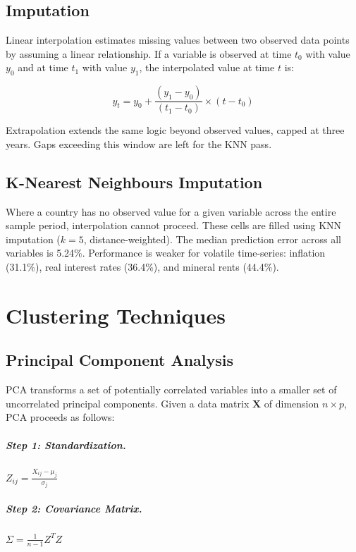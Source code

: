 \documentclass[12pt,a4paper]{report}
\begin{document}
\begin{appendices}
\section{Imputation}

Linear interpolation estimates missing values between two observed data points by assuming a linear relationship. If a variable is observed at time $t_0$ with value $y_0$ and at time $t_1$ with value $y_1$, the interpolated value at time $t$ is:

\begin{equation}
y_t = y_0 + \frac{(y_1 - y_0)}{(t_1 - t_0)} \times (t - t_0)
\end{equation}

Extrapolation extends the same logic beyond observed values, capped at three years. Gaps exceeding this window are left for the KNN pass.

\section{K-Nearest Neighbours Imputation}

Where a country has no observed value for a given variable across the entire sample period, interpolation cannot proceed. These cells are filled using KNN imputation ($k=5$, distance-weighted). The median prediction error across all variables is 5.24\%. Performance is weaker for volatile time-series: inflation (31.1\%), real interest rates (36.4\%), and mineral rents (44.4\%).


\chapter{Clustering Techniques}

\section{Principal Component Analysis}

PCA transforms a set of potentially correlated variables into a smaller set of uncorrelated principal components. Given a data matrix $\mathbf{X}$ of dimension $n \times p$, PCA proceeds as follows:

\paragraph{Step 1: Standardization.}
$Z_{ij} = \frac{X_{ij} - \mu_j}{\sigma_j}$

\paragraph{Step 2: Covariance Matrix.}
$\Sigma = \frac{1}{n-1} Z^T Z$


\end{appendices}
\end{document}
